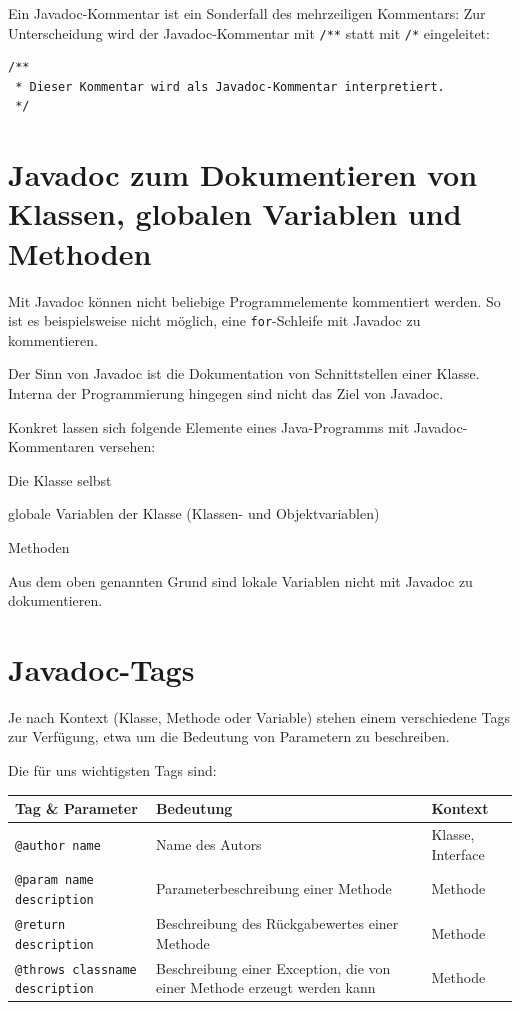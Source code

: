 Ein Javadoc-Kommentar ist ein Sonderfall des mehrzeiligen Kommentars: Zur
Unterscheidung wird der Javadoc-Kommentar mit \lstinline|/**| statt mit
\lstinline|/*| eingeleitet:

\begin{lstlisting}
/**
 * Dieser Kommentar wird als Javadoc-Kommentar interpretiert.
 */
\end{lstlisting}


\section{Javadoc zum Dokumentieren von Klassen, globalen Variablen und Methoden}

Mit Javadoc können nicht beliebige Programmelemente kommentiert werden. So ist
es beispielsweise nicht möglich, eine \lstinline|for|-Schleife mit Javadoc zu
kommentieren.

Der Sinn von Javadoc ist die Dokumentation von Schnittstellen einer Klasse.
Interna der Programmierung hingegen sind nicht das Ziel von Javadoc.

Konkret lassen sich folgende Elemente eines Java-Programms mit
Javadoc-Kommentaren versehen:

\begin{compactitem}
\item Die Klasse selbst
\item globale Variablen der Klasse (Klassen- und Objektvariablen)
\item Methoden
\end{compactitem}

Aus dem oben genannten Grund sind lokale Variablen nicht mit Javadoc zu
dokumentieren.


\section{Javadoc-Tags}

Je nach Kontext (Klasse, Methode oder Variable) stehen einem verschiedene Tags
zur Verfügung, etwa um die Bedeutung von Parametern zu beschreiben.

Die für uns wichtigsten Tags sind:

\bgroup
\def\arraystretch{1.2}
\begin{tabularx}{\textwidth}{|X|p{60mm}|p{25mm}|}\hline
\textbf{Tag \& Parameter} & \textbf{Bedeutung} & \textbf{Kontext} \\ \hline
\lstinline|@author name| & Name des Autors & Klasse, Interface \\ \hline
\lstinline|@param name description| & Parameterbeschreibung einer Methode
& Methode \\ \hline 
\lstinline|@return description| & Beschreibung des Rückgabewertes einer Methode
& Methode \\ \hline
\lstinline|@throws classname description| & Beschreibung einer Exception, die
von einer Methode erzeugt werden kann & Methode \\ \hline
\end{tabularx}
\egroup

